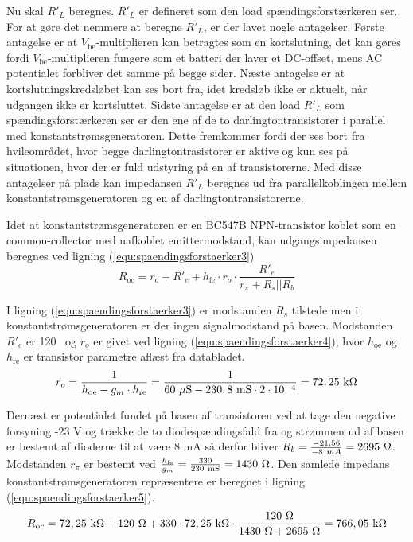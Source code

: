 Nu skal $R'_L$ beregnes. $R'_L$ er defineret som den load spændingsforstærkeren ser. For at gøre det nemmere at beregne $R'_L$, er der lavet nogle antagelser. Første antagelse er at $V_\mathrm{be}$-multiplieren kan betragtes som en kortslutning, det kan gøres fordi $V_\mathrm{be}$-multiplieren fungere som et batteri der laver et DC-offset, mens AC potentialet  forbliver det samme på begge sider. Næste antagelse er at kortslutningskredsløbet kan ses bort fra, idet kredsløb ikke er aktuelt, når udgangen ikke er kortsluttet. Sidste antagelse er at den load $R'_L$ som spændingsforstærkeren ser er den ene af de to darlingtontransistorer i parallel med konstantstrømsgeneratoren. Dette fremkommer fordi der ses bort fra hvileområdet, hvor begge darlingtontrasistorer er aktive og kun ses på situationen, hvor der er fuld udstyring på en af transistorerne.
Med disse antagelser på plads kan impedansen $R'_L$ beregnes ud fra parallelkoblingen mellem konstantstrømsgeneratoren og en af darlingtontransistorerne.

Idet at konstantstrømsgeneratoren er en BC547B NPN-transistor koblet som en common-collector med uafkoblet emittermodstand, kan udgangsimpedansen beregnes ved ligning (\ref{equ:spaendingsforstaerker3})
\begin{equation}
\label{equ:spaendingsforstaerker3}
R_{\mathrm{oc}} = r_o + R'_e + h_{\mathrm{fe}} \cdot r_o \cdot \frac{R'_e}{r_{\pi} + R_s || R_b}
\end{equation}

I ligning (\ref{equ:spaendingsforstaerker3}) er modstanden $R_s$ tilstede men i konstantstrømsgeneratoren er der ingen signalmodstand på basen. Modstanden $R'_e$ er 120 \ohm~og $r_o$ er givet ved ligning (\ref{equ:spaendingsforstaerker4}), hvor $h_{\mathrm{oe}}$ og $h_{\mathrm{re}}$ er transistor parametre aflæst fra databladet.
\begin{equation}
\label{equ:spaendingsforstaerker4}
r_o = \frac{1}{h_{\mathrm{oe}} - g_m \cdot h_{\mathrm{re}}} = \frac{1}{60~\mathrm{\mu S} - 230,8~\mathrm{mS} \cdot 2 \cdot 10^{-4}} = 72,25~\mathrm{k}\ohm
\end{equation}

Dernæst er potentialet fundet på basen af transistoren ved at tage den negative forsyning -23 V og trække de to diodespændingsfald fra og strømmen ud af basen er bestemt af dioderne til at være 8 mA så derfor bliver $R_b = \frac{-21,56}{-8~mA} = 2695~\ohm$. Modstanden $r_{\pi}$ er bestemt ved $\frac{h_{\mathrm{fe}}}{g_m} = \frac{330}{230~\mathrm{mS}} = 1430~\ohm$. Den samlede impedans konstantstrømsgeneratoren repræsentere er beregnet i ligning (\ref{equ:spaendingsforstaerker5}). 
\begin{equation}
\label{equ:spaendingsforstaerker5}
R_{\mathrm{oc}} = 72,25~\mathrm{k}\ohm + 120~\ohm + 330 \cdot 72,25~\mathrm{k}\ohm \cdot \frac{120~\ohm}{1430~\ohm + 2695~\ohm} = 766,05~\mathrm{k}\ohm
\end{equation}


